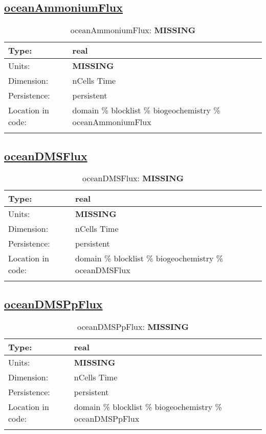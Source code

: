 \subsection[oceanAmmoniumFlux]{\hyperref[sec:var_tab_biogeochemistry]{oceanAmmoniumFlux}}
\label{subsec:var_sec_biogeochemistry_oceanAmmoniumFlux}
\begin{center}
\begin{longtable}{| p{2.0in} | p{4.0in} |}
        \hline 
        Type: & real \\
        \hline 
        Units: & {\bf \color{red} MISSING} \\
        \hline 
        Dimension: & nCells Time \\
        \hline 
        Persistence: & persistent \\
        \hline 
         Location in code: & domain \% blocklist \% biogeochemistry \% oceanAmmoniumFlux \\
         \hline 
    \caption{oceanAmmoniumFlux: {\bf \color{red} MISSING}}
\end{longtable}
\end{center}
\subsection[oceanDMSFlux]{\hyperref[sec:var_tab_biogeochemistry]{oceanDMSFlux}}
\label{subsec:var_sec_biogeochemistry_oceanDMSFlux}
\begin{center}
\begin{longtable}{| p{2.0in} | p{4.0in} |}
        \hline 
        Type: & real \\
        \hline 
        Units: & {\bf \color{red} MISSING} \\
        \hline 
        Dimension: & nCells Time \\
        \hline 
        Persistence: & persistent \\
        \hline 
         Location in code: & domain \% blocklist \% biogeochemistry \% oceanDMSFlux \\
         \hline 
    \caption{oceanDMSFlux: {\bf \color{red} MISSING}}
\end{longtable}
\end{center}
\subsection[oceanDMSPpFlux]{\hyperref[sec:var_tab_biogeochemistry]{oceanDMSPpFlux}}
\label{subsec:var_sec_biogeochemistry_oceanDMSPpFlux}
\begin{center}
\begin{longtable}{| p{2.0in} | p{4.0in} |}
        \hline 
        Type: & real \\
        \hline 
        Units: & {\bf \color{red} MISSING} \\
        \hline 
        Dimension: & nCells Time \\
        \hline 
        Persistence: & persistent \\
        \hline 
         Location in code: & domain \% blocklist \% biogeochemistry \% oceanDMSPpFlux \\
         \hline 
    \caption{oceanDMSPpFlux: {\bf \color{red} MISSING}}
\end{longtable}
\end{center}
